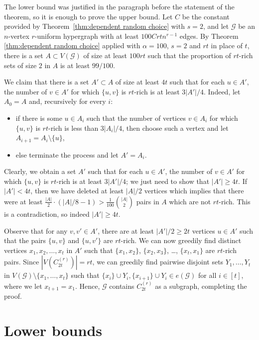 \documentclass[a4paper,11pt]{article}
\makeatletter
\renewenvironment{proof}[1][\proofname] {\par\pushQED{\qed}\normalfont\topsep6\p@\@plus6\p@\relax\trivlist\item[\hskip\labelsep\bfseries#1\@addpunct{.}]\ignorespaces}{\popQED\endtrivlist\@endpefalse}
\theoremstyle{definition}
\def\cG{\mathcal{G}}
\makeatother
\begin{document}
\begin{proof}[Proof of Theorem \ref{thm:cycle}]
The lower bound was justified in the paragraph before the statement of the theorem, so it is enough to prove the upper bound. Let $C$ be the constant provided by Theorem~\ref{thm:dependent random choice} with $s=2$, and let $\cG$ be an $n$-vertex $r$-uniform hypergraph with at least $100Crtn^{r-1}$ edges. By Theorem \ref{thm:dependent random choice} applied with $\alpha=100$, $s=2$ and $rt$ in place of $t$, there is a set $A\subset V(\cG)$ of size at least $100rt$ such that the proportion of $rt$-rich sets of size $2$ in $A$ is at least $99/100$.

We claim that there is a set $A'\subset A$ of size at least $4t$ such that for each $u\in A'$, the number of $v\in A'$ for which $\{u,v\}$ is $rt$-rich is at least $3|A'|/4$. Indeed, let $A_0=A$ and, recursively for every $i$:
\begin{itemize}
    \item if there is some $u\in A_i$ such that the number of vertices $v\in A_i$ for which $\{u,v\}$ is $rt$-rich is less than $3|A_i|/4$, then choose such a vertex and let $A_{i+1}=A_i\setminus \{u\}$, 
    \item else terminate the process and let $A'=A_i$.
\end{itemize}
Clearly, we obtain a set $A'$ such that for each $u\in A'$, the number of $v\in A'$ for which $\{u,v\}$ is $rt$-rich is at least $3|A'|/4$; we just need to show that $|A'|\geq 4t$. If $|A'|<4t$, then we have deleted at least $|A|/2$ vertices which implies that there were at least $\frac{|A|}{2}\cdot (|A|/8-1)>\frac{1}{100}\binom{|A|}{2}$ pairs in $A$ which are not $rt$-rich. This is a contradiction, so indeed $|A'|\geq 4t$.

\sloppy Observe that for any $v, v' \in A'$, there are at least $|A'| / 2 \ge 2t$ vertices $u\in A'$ such that the pairs $\{u, v\}$ and $\{u, v'\}$ are $rt$-rich. We can now greedily find distinct vertices $x_1,x_2,\dots,x_t$ in $A'$ such that $\{x_1,x_2\}$, $\{x_2,x_3\}$, \dots, $\{x_t,x_1\}$ are $rt$-rich pairs. Since $|V(C_{2t}^{(r)})| = rt$, we can greedily find pairwise disjoint sets $Y_1, \dots, Y_t$ in $V(\cG)\setminus \{x_1,\dots,x_t\}$ such that $\{x_i\} \cup Y_i, \{x_{i+1}\} \cup Y_i \in e(\cG)$ for all $i \in [t]$, where we let $x_{t+1} = x_1$. Hence, $\cG$ contains $C_{2t}^{(r)}$ as a subgraph, completing the proof.
\end{proof}

\section{Lower bounds} \label{sec:lower}
\end{document}
